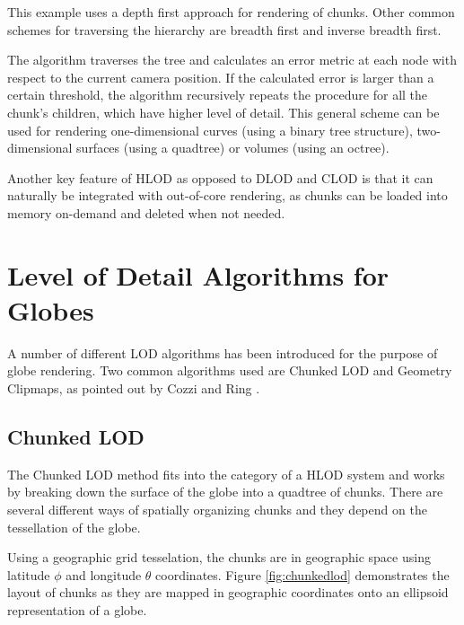 This example uses a depth first approach for rendering of chunks. Other common schemes for traversing the hierarchy are breadth first and inverse breadth first.

The algorithm traverses the tree and calculates an error metric at each node with respect to the current camera position. If the calculated error is larger than a certain threshold, the algorithm recursively repeats the procedure for all the chunk's children, which have higher level of detail. This general scheme can be used for rendering one-dimensional curves (using a binary tree structure), two-dimensional surfaces (using a quadtree) or volumes (using an octree).

Another key feature of HLOD as opposed to DLOD and CLOD is that it can naturally be integrated with out-of-core rendering, as chunks can be loaded into memory on-demand and deleted when not needed.



\section{Level of Detail Algorithms for Globes}
A number of different LOD algorithms has been introduced for the purpose of globe rendering. Two common algorithms used are Chunked LOD and Geometry Clipmaps, as pointed out by Cozzi and Ring \cite{cozzi11}.

\subsection{Chunked LOD}
\label{section:chunkedlodbacground}
The Chunked LOD method fits into the category of a HLOD system and works by breaking down the surface of the globe into a quadtree of chunks. There are several different ways of spatially organizing chunks and they depend on the tessellation of the globe. 

Using a geographic grid tesselation, the chunks are in geographic space using latitude $\phi$ and longitude $\theta$ coordinates. Figure \ref{fig:chunkedlod} demonstrates the layout of chunks as they are mapped in geographic coordinates onto an ellipsoid representation of a globe.

